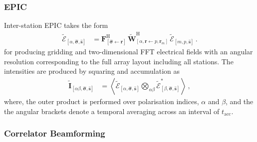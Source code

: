 \documentclass[
  journal=pasa,
  manuscript=article-type,
  year=2020,
  volume=37,
]{cup-journal}
\begin{document}
\subsubsection{EPIC}


Inter-station EPIC takes the form
\begin{align}
    \widetilde{\boldsymbol{\mathcal{E}}}_{[\alpha,\hat{\boldsymbol{\sigma}},\hat{\boldsymbol{s}}]} &= \mathbf{F}^\textrm{H}_{[\hat{\boldsymbol{\sigma}}\leftarrow \boldsymbol{r}]}\,\widetilde{\mathbf{W}}^\textrm{H}_{[\alpha,\boldsymbol{r}\leftarrow p,\boldsymbol{r}_{m}]}\,\widetilde{\boldsymbol{\mathcal{E}}}_{[m,p,\hat{\boldsymbol{s}}]} \, . \label{eqn:inter-station-pol-hol-img-epic-LA}
\end{align}
for producing gridding and two-dimensional FFT electrical fields with an angular resolution corresponding to the full array layout including all stations. The intensities are produced by squaring and accumulation as
\begin{align}
    \widetilde{\mathbf{I}}_{[\alpha\beta,\hat{\boldsymbol{\sigma}},\hat{\boldsymbol{s}}]} &= \left\langle \widetilde{\boldsymbol{\mathcal{E}}}_{[\alpha,\hat{\boldsymbol{\sigma}},\hat{\boldsymbol{s}}]} \bigotimes_{\alpha\beta} \widetilde{\boldsymbol{\mathcal{E}}}_{[\beta,\hat{\boldsymbol{\sigma}},\hat{\boldsymbol{s}}]}^* \right\rangle \, , \label{eqn:inter-station-opt-polarimetric-direct-img-LA}    
\end{align}
where, the outer product is performed over polarisation indices, $\alpha$ and $\beta$, and the the angular brackets denote a temporal averaging across an interval of $t_\textrm{acc}$.  


\subsubsection{Correlator Beamforming}
\end{document}
